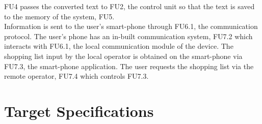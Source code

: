 {FU4 passes the converted text to FU2, the control unit so that the text is saved to the memory of the system, FU5. \\
Information is sent to the user's smart-phone through FU6.1, the communication protocol. The user's phone has an in-built communication system, FU7.2 which interacts with FU6.1, the local communication module of the device. The shopping list input by the local operator is obtained on the smart-phone via FU7.3, the smart-phone application. The user requests the shopping list via the remote operator, FU7.4 which controls FU7.3.
\clearpage
\newpage




\section{Target Specifications}

}
